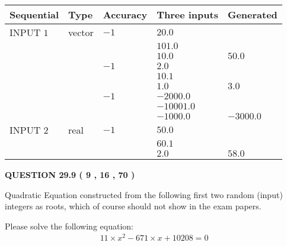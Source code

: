\documentclass[12pt]{article}
\begin{document}
  
\noindent\begin{tabular}{|l|l|l|l|l|}
\hline
 Sequential & Type & Accuracy & Three inputs & Generated \\ 
\hline
 
 
  INPUT $            1 $ & vector & $           -1  $ & $
20.0
  $ & \\
  & & & $
101.0
  $ & \\
  & & & $
10.0
$ & $ 50.0 $ 
  \\
  & & $           -1  $ & $
2.0
  $ & \\
  & & & $
10.1
  $ & \\
  & & & $
1.0
$ & $ 3.0 $ 
  \\
  & & $           -1  $ & $
-2000.0
  $ & \\
  & & & $
-10001.0
  $ & \\
  & & & $
-1000.0
$ & $ -3000.0 $ 
 \\  \hline  
 
 
  INPUT $            2 $ & real & $           -1  $ & $
 50.0
  $ & \\
  & & &  $
 60.1
  $ & \\
  & & &  $
 2.0
 $ & $ 58.0 $ 
 \\  \hline  
 \end{tabular}
   
   
  
\vspace{0.2in}
  
{\textbf{\Large{QUESTION
29.9 
 (           9 ,          16 ,          70 )
}}}
  
  


\noindent{}
Quadratic Equation constructed from the following first two random (input) integers as roots,  
which of course should not show in the exam papers.  
\noindent{}


 
 

 
Please solve the following equation:
\begin{eqnarray*}
11 \times x^2  %
-671
                 \times x    %
+  %
10208 =0
\end{eqnarray*}
 
 
 
\noindent{}
 
\end{document}
